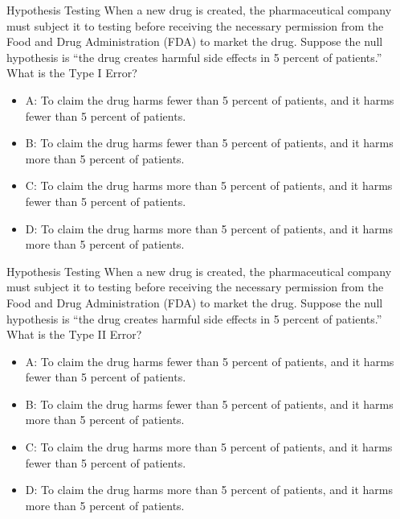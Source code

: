 \documentclass{beamer}
\begin{document}
\begin{frame}{Hypothesis Testing}
When a new drug is created, the pharmaceutical company must subject it to testing before receiving the necessary
permission from the Food and Drug Administration (FDA) to market the drug. Suppose the null hypothesis is ``the drug creates harmful side effects in 5 percent of patients.'' What is the Type I Error?
\begin{itemize}
\item A: To claim the drug harms fewer than 5 percent of patients, and it harms fewer than 5 percent of patients.
\item B: To claim the drug harms fewer than 5 percent of patients, and it harms more than 5 percent of patients.
\item C: To claim the drug harms more than 5 percent of patients, and it harms fewer than 5 percent of patients.
\item D: To claim the drug harms more than 5 percent of patients, and it harms more than 5 percent of patients.
\end{itemize}
\end{frame}

\begin{frame}{Hypothesis Testing}
When a new drug is created, the pharmaceutical company must subject it to testing before receiving the necessary
permission from the Food and Drug Administration (FDA) to market the drug. Suppose the null hypothesis is ``the drug creates harmful side effects in 5 percent of patients.'' What is the Type II Error?
\begin{itemize}
\item A: To claim the drug harms fewer than 5 percent of patients, and it harms fewer than 5 percent of patients.
\item B: To claim the drug harms fewer than 5 percent of patients, and it harms more than 5 percent of patients.
\item C: To claim the drug harms more than 5 percent of patients, and it harms fewer than 5 percent of patients.
\item D: To claim the drug harms more than 5 percent of patients, and it harms more than 5 percent of patients.
\end{itemize}
\end{frame}
\end{document}
